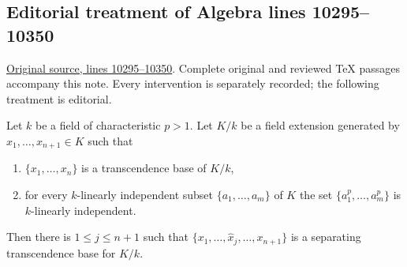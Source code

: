 







\subsection{Editorial treatment of Algebra lines 10295--10350}

\hypertarget{algebra-context-120}{}

\noindent\href{https://github.com/stacks/stacks-project/blob/a04446e57ec1fbc252a871afcec7752fb2807b14/algebra.tex\#L10295}{Original source, lines 10295--10350}. Complete original and reviewed TeX passages accompany this note. Every intervention is separately recorded; the following treatment is editorial.


\begin{lemma}
\label{editorial-source-lemma-mini-separability}
Let $k$ be a field of characteristic $p > 1$. Let $K/k$
be a field extension generated by $x_1, \ldots, x_{n + 1} \in K$ such that
\begin{enumerate}
\item $\{x_1, \ldots, x_n\}$ is a transcendence base of $K/k$,
\item for every $k$-linearly independent subset
$\{a_1, \ldots, a_m\}$ of $K$ the set
$\{a^p_1, \ldots, a_m^p\}$ is $k$-linearly independent.
\end{enumerate}
Then there is $1 \leq j \leq n+1$ such that
$\{ x_1, \ldots, \widehat{x}_j, \ldots, x_{n+1}\}$
is a separating transcendence base for $K / k$.
\end{lemma}

